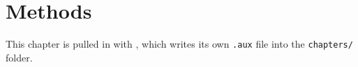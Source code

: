 \chapter{Methods}
This chapter is pulled in with \verb||, which writes its own \texttt{.aux} file
into the \texttt{chapters/} folder.
